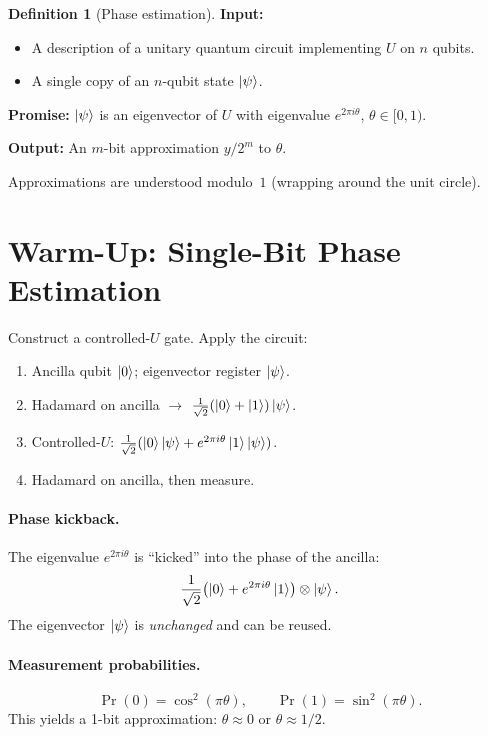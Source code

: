 \documentclass[11pt]{article}
\theoremstyle{definition}
\newtheorem{definition}{Definition}[section]
\begin{document}
\begin{definition}[Phase estimation]
\textbf{Input:}
\begin{itemize}
    \item A description of a unitary quantum circuit implementing $U$ on $n$ qubits.
    \item A single copy of an $n$-qubit state $\ket{\psi}$.
\end{itemize}
\textbf{Promise:} $\ket{\psi}$ is an eigenvector of $U$ with eigenvalue $e^{2\pi i\theta}$, $\theta\in[0,1)$.

\textbf{Output:} An $m$-bit approximation $y/2^m$ to $\theta$.
\end{definition}

Approximations are understood modulo~$1$ (wrapping around the unit circle).

\section{Warm-Up: Single-Bit Phase Estimation}

Construct a controlled-$U$ gate.  Apply the circuit:
\begin{enumerate}
    \item Ancilla qubit $\ket{0}$; eigenvector register $\ket{\psi}$.
    \item Hadamard on ancilla $\to$ $\frac{1}{\sqrt{2}}(\ket{0}+\ket{1})\ket{\psi}$.
    \item Controlled-$U$: $\frac{1}{\sqrt{2}}(\ket{0}\ket{\psi}+e^{2\pi i\theta}\ket{1}\ket{\psi})$.
    \item Hadamard on ancilla, then measure.
\end{enumerate}

\paragraph{Phase kickback.}  The eigenvalue $e^{2\pi i\theta}$ is ``kicked'' into the phase of the ancilla:
\[
    \frac{1}{\sqrt{2}}\bigl(\ket{0}+e^{2\pi i\theta}\ket{1}\bigr)\otimes\ket{\psi}.
\]
The eigenvector $\ket{\psi}$ is \emph{unchanged} and can be reused.

\paragraph{Measurement probabilities.}
\[
    \Pr(0)=\cos^2(\pi\theta),\qquad \Pr(1)=\sin^2(\pi\theta).
\]
This yields a 1-bit approximation: $\theta\approx 0$ or $\theta\approx 1/2$.
\end{document}
